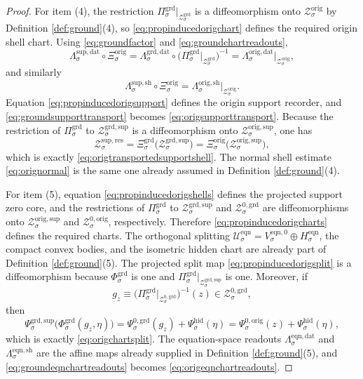 \documentclass[11pt]{article}
\newcommand{\ResData}[1]{\Lambda_{#1}^{\mathrm{sup,dat}}}
\newcommand{\ResShellMap}[1]{\Lambda_{#1}^{\mathrm{sup,sh}}}
\newcommand{\ResShellSet}[1]{\mathcal Z_{#1}^{\mathrm{sup,res}}}
\newcommand{\HiddenChart}[1]{\Psi_{#1}^{\mathrm{hid}}}
\newcommand{\OrigData}[1]{\Lambda_{#1}^{\mathrm{orig,dat}}}
\newcommand{\OrigShellMap}[1]{\Lambda_{#1}^{\mathrm{orig,sh}}}
\newcommand{\OrigShellSet}[1]{\mathcal Z_{#1}^{\mathrm{orig}}}
\newcommand{\OrigChart}[1]{\Xi_{#1}^{\mathrm{orig}}}
\newcommand{\OrigSupportShell}[1]{\mathcal Z_{#1}^{\mathrm{orig,sup}}}
\newcommand{\OrigZeroCore}[1]{\mathcal Z_{#1}^{0,\mathrm{orig}}}
\newcommand{\OrigZeroChart}[1]{\Psi_{#1}^{0,\mathrm{orig}}}
\newcommand{\GroundProj}[1]{\Pi_{#1}^{\mathrm{grd}}}
\newcommand{\GroundData}[1]{\Lambda_{#1}^{\mathrm{grd,dat}}}
\newcommand{\GroundShellSet}[1]{\mathcal Z_{#1}^{\mathrm{grd}}}
\newcommand{\GroundChart}[1]{\Xi_{#1}^{\mathrm{grd}}}
\newcommand{\GroundSupportShell}[1]{\mathcal Z_{#1}^{\mathrm{grd,sup}}}
\newcommand{\GroundZeroCore}[1]{\mathcal Z_{#1}^{0,\mathrm{grd}}}
\newcommand{\GroundEqChart}[1]{\Psi_{#1}^{\mathrm{grd,sup}}}
\newcommand{\GroundZeroChart}[1]{\Psi_{#1}^{0,\mathrm{grd}}}
\newcommand{\GroundSplit}[1]{\Phi_{#1}^{\mathrm{grd}}}
\newcommand{\EqnSpace}[1]{\mathcal U_{#1}^{\mathrm{eqn}}}
\newcommand{\EqnData}[1]{\Lambda_{#1}^{\mathrm{eqn,dat}}}
\newcommand{\EqnShell}[1]{\Lambda_{#1}^{\mathrm{eqn,sh}}}
\newcommand{\EqnHidden}[1]{H_{#1}^{\mathrm{eqn}}}
\newcommand{\EqnZero}[1]{V_{#1}^{\mathrm{eqn},0}}
\begin{document}
\begin{proof}
For item (4), the restriction \(\GroundProj{\sigma}\big|_{\GroundShellSet{\sigma}}\) is a diffeomorphism onto \(\OrigShellSet{\sigma}\) by Definition \ref{def:ground}(4), so \eqref{eq:propinducedorigchart} defines the required origin shell chart. Using \eqref{eq:groundfactor} and \eqref{eq:groundchartreadouts},
\[
\ResData{\sigma}\circ\OrigChart{\sigma}
=
\GroundData{\sigma}\circ
\bigl(\GroundProj{\sigma}\big|_{\GroundShellSet{\sigma}}\bigr)^{-1}
=
\OrigData{\sigma}\big|_{\OrigShellSet{\sigma}},
\]
and similarly
\[
\ResShellMap{\sigma}\circ\OrigChart{\sigma}
=
\OrigShellMap{\sigma}\big|_{\OrigShellSet{\sigma}}.
\]
Equation \eqref{eq:propinducedorigsupport} defines the origin support recorder, and \eqref{eq:groundsupporttransport} becomes \eqref{eq:origsupporttransport}. Because the restriction of \(\GroundProj{\sigma}\) to \(\GroundSupportShell{\sigma}\) is a diffeomorphism onto \(\OrigSupportShell{\sigma}\), one has
\[
\ResShellSet{\sigma}
=
\GroundChart{\sigma}\bigl(\GroundSupportShell{\sigma}\bigr)
=
\OrigChart{\sigma}\bigl(\OrigSupportShell{\sigma}\bigr),
\]
which is exactly \eqref{eq:origtransportedsupportshell}. The normal shell estimate \eqref{eq:orignormal} is the same one already assumed in Definition \ref{def:ground}(4).

For item (5), equation \eqref{eq:propinducedorigshells} defines the projected support zero core, and the restrictions of \(\GroundProj{\sigma}\) to \(\GroundSupportShell{\sigma}\) and \(\GroundZeroCore{\sigma}\) are diffeomorphisms onto \(\OrigSupportShell{\sigma}\) and \(\OrigZeroCore{\sigma}\), respectively. Therefore \eqref{eq:propinducedorigcharts} defines the required charts. The orthogonal splitting \(\EqnSpace{\sigma}=\EqnZero{\sigma}\oplus\EqnHidden{\sigma}\), the compact convex bodies, and the isometric hidden chart are already part of Definition \ref{def:ground}(5). The projected split map \eqref{eq:propinducedorigsplit} is a diffeomorphism because \(\GroundSplit{\sigma}\) is one and \(\GroundProj{\sigma}\big|_{\GroundSupportShell{\sigma}}\) is one. Moreover, if
\[
g_z
\equiv
\bigl(\GroundProj{\sigma}\big|_{\GroundZeroCore{\sigma}}\bigr)^{-1}(z)
\in
\GroundZeroCore{\sigma},
\]
then
\[
\GroundEqChart{\sigma}\bigl(\GroundSplit{\sigma}(g_z,\eta)\bigr)
=
\GroundZeroChart{\sigma}(g_z)+\HiddenChart{\sigma}(\eta)
=
\OrigZeroChart{\sigma}(z)+\HiddenChart{\sigma}(\eta),
\]
which is exactly \eqref{eq:origchartsplit}. The equation-space readouts \(\EqnData{\sigma}\) and \(\EqnShell{\sigma}\) are the affine maps already supplied in Definition \ref{def:ground}(5), and \eqref{eq:groundeqnchartreadouts} becomes \eqref{eq:origeqnchartreadouts}.


\end{proof}
\end{document}
